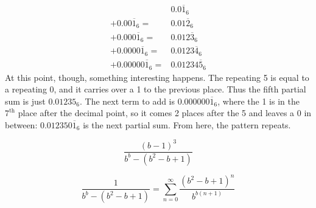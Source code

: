 \documentclass{article}
\begin{document}
\begin{align*}
  & 0.0\overline{1}_6 \\
  + 0.00\overline{1}_6 =& 0.01\overline{2}_6 \\
  + 0.000\overline{1}_6 =& 0.012\overline{3}_6 \\
  + 0.0000\overline{1}_6 =& 0.0123\overline{4}_6 \\
  + 0.00000\overline{1}_6 =& 0.01234\overline{5}_6
\end{align*}
At this point, though, something interesting happens.
The repeating 5 is equal to a repeating 0,
and it carries over a 1 to the previous place.
Thus the fifth partial sum is just $0.01235_6$.
The next term to add is $0.000000\overline{1}_6$,
where the 1 is in the $7^\text{th}$ place after the decimal point,
so it comes 2 places after the 5 and leaves a 0 in between:
$0.012350\overline{1}_6$ is the next partial sum.
From here, the pattern repeats.

\[\frac{(b-1)^3}{b^b-(b^2-b+1)}\]

\[\frac{1}{b^b-(b^2-b+1)} = \sum_{n=0}^\infty \frac{(b^2-b+1)^n}{b^{b(n+1)}} \]
\end{document}

